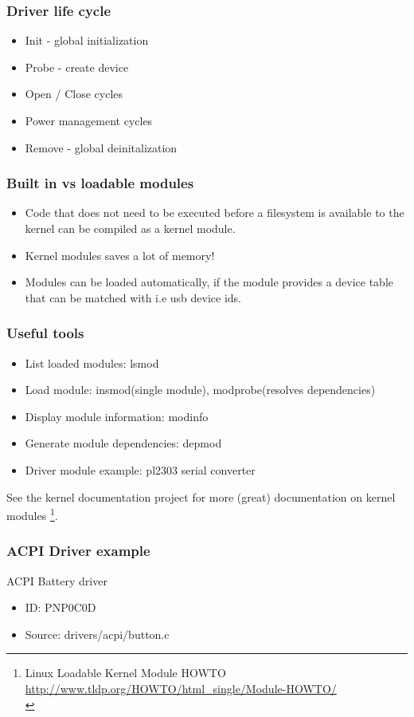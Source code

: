 \documentclass{beamer}
\begin{document}
\begin{frame}
\frametitle{Driver life cycle}
\begin{itemize}
	\item Init - global initialization
	\item Probe - create device
	\item Open / Close cycles
	\item Power management cycles
	\item Remove - global deinitalization
\end{itemize}
\end{frame}

\begin{frame}
\frametitle{Built in vs loadable modules}
\begin{itemize}
\item Code that does not need to be executed before a filesystem is available to the kernel can be compiled as a kernel module. \\
\item Kernel modules saves a lot of memory!
\item Modules can be loaded automatically, if the module provides a device table that can be matched with i.e usb device ids. \\
\end{itemize}
\end{frame}

\begin{frame}
\frametitle{Useful tools}
\begin{itemize}
	\item List loaded modules: lsmod
	\item Load module: insmod(single module), modprobe(resolves dependencies)
	\item Display module information: modinfo
	\item Generate module dependencies: depmod
	\item Driver module example: pl2303 serial converter\\
\end{itemize}
See the kernel documentation project for more (great) documentation on kernel modules \footnote{Linux Loadable Kernel Module HOWTO \url{http://www.tldp.org/HOWTO/html\_single/Module-HOWTO/}\\}.
\end{frame}

\begin{frame}
\frametitle{ACPI Driver example}
ACPI Battery driver
\begin{itemize}
	\item ID: PNP0C0D
	\item Source: drivers/acpi/button.c
\end{itemize}
\end{frame}
\end{document}
